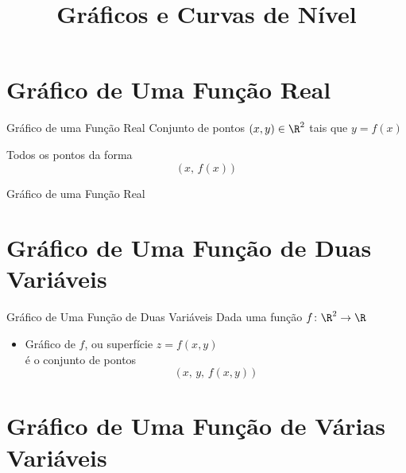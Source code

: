 
\usepackage{calculo_varias_variaveis-1}

\title {Gráficos e Curvas de Nível}



\addtitle

\section{Gráfico de Uma Função Real}

\begin{frame}{Gráfico de uma Função Real}
  Conjunto de pontos $(x, y) \in \R^2$ tais que \(y = f(x)\)

  \pause
  \vspace{\baselineskip}
  Todos os pontos da forma
  \[
    \big( \, x, \, f(x) \, \big)
  \]
\end{frame}

\begin{frame}{Gráfico de uma Função Real}
  \centering
  
\end{frame}

\section{Gráfico de Uma Função de Duas Variáveis}

\begin{frame}{Gráfico de Uma Função de Duas Variáveis}
  Dada uma função \(f\colon\R^2\to\R\)
  \begin{itemize}[<+->]
    \item Gráfico de $f$, ou superfície \(z=f(x, y)\) \\
    é o conjunto de pontos
    \[
      \big( \, x, \, y, \, f(x, y) \, \big)
    \]
  \end{itemize}
\end{frame}

\section{Gráfico de Uma Função de Várias Variáveis}

